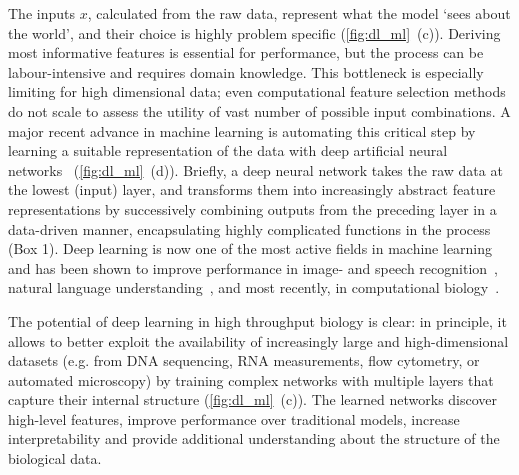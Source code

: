 The inputs $x$, calculated from the raw data, represent what the model `sees about the world', and their choice is highly problem specific (\autoref{fig:dl_ml}~(c)). Deriving most informative features is essential for performance, but the process can be labour-intensive and requires domain knowledge. This bottleneck is especially limiting for high dimensional data; even computational feature selection methods do not scale to assess the utility of vast number of possible input combinations. A major recent advance in machine learning is automating this critical step by learning a suitable representation of the data with deep artificial neural networks~\citep{bengio_representation_2013,lecun_deep_2015,schmidhuber_deep_2015} (\autoref{fig:dl_ml}~(d)). Briefly, a deep neural network takes the raw data at the lowest (input) layer, and transforms them into increasingly abstract feature representations by successively combining outputs from the preceding layer in a data-driven manner, encapsulating highly complicated functions in the process (Box 1). Deep learning is now one of the most active fields in machine learning and has been shown to improve performance in image- and speech recognition~\citep{deng_deep_2015,graves_generating_2013,hinton_deep_2012,krizhevsky_imagenet_2012,zeiler_visualizing_2014-1}, natural language understanding~\citep{bahdanau_neural_2014,lipton_critical_2015,sutskever_sequence_2014,xiong_dynamic_2016}, and most recently, in computational biology~\citep{alipanahi_predicting_2015,dahl_multi-task_2014,eickholt_dndisorder:_2013,kelley_basset:_2016,leung_deep_2014,sonderby_protein_2014,wang_chromatin_2015,zhou_predicting_2015}.

The potential of deep learning in high throughput biology is clear: in principle, it allows to better exploit the availability of increasingly large and high-dimensional datasets (e.g. from DNA sequencing, RNA measurements, flow cytometry, or automated microscopy) by training complex networks with multiple layers that capture their internal structure (\autoref{fig:dl_ml}~(c)). The learned networks discover high-level features, improve performance over traditional models, increase interpretability and provide additional understanding about the structure of the biological data.

